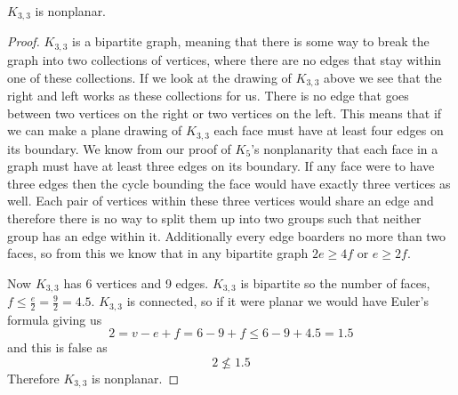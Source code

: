 \documentclass{article}
\begin{document}
\begin{theorem}
	$K_{3,3}$ is nonplanar.
\end{theorem}
\begin{center}
		
\end{center}
\begin{proof}
	$K_{3,3}$ is a bipartite graph, meaning that there is some way to break the graph into two collections of vertices, where there are no edges that stay within one of these collections. If we look at the drawing of $K_{3,3}$ above we see that the right and left works as these collections for us. There is no edge that goes between two vertices on the right or two vertices on the left. This means that if we can make a plane drawing of $K_{3,3}$ each face must have at least four edges on its boundary. We know from our proof of $K_5$'s nonplanarity that each face in a graph must have at least three edges on its boundary. If any face were to have three edges then the cycle bounding the face would have exactly three vertices as well. Each pair of vertices within these three vertices would share an edge and therefore there is no way to split them up into two groups such that neither group has an edge within it. Additionally every edge boarders no more than two faces, so from this we know that in any bipartite graph $2e \ge 4f$ or $e\ge 2f$.
	
	Now $K_{3,3}$ has 6 vertices and 9 edges. $K_{3,3}$ is bipartite so the number of faces, $f \le \frac e2 = \frac92 = 4.5$. $K_{3,3}$ is connected, so if it were planar we would have Euler's formula giving us $$2=v-e+f=6-9+f\le6-9+4.5=1.5$$ and this is false as $$2\not\le1.5$$ Therefore $K_{3,3}$ is nonplanar.
\end{proof}
\end{document}
